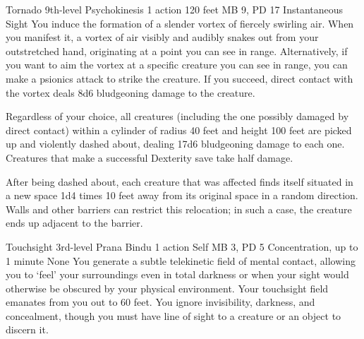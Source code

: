\DndPowerHeader%
    {Tornado\label{pwr:tornado}}
    {9th-level Psychokinesis}
    {1 action}
    {120 feet}
    {MB 9, PD 17}
    {Instantaneous}
    {Sight}
You induce the formation of a slender vortex
of fiercely swirling air. When you manifest it, a vortex of
air visibly and audibly snakes out from your outstretched
hand, originating at a point you can see in range.
Alternatively,
if you want to aim the vortex at a specific creature you can
see in range, you can make a psionics attack to strike the
creature. If you succeed, direct contact with the vortex deals
8d6 bludgeoning damage to the creature.

Regardless of your choice,
all creatures (including the one possibly damaged
by direct contact) within a cylinder of radius
40 feet and height 100 feet are picked up and violently dashed
about, dealing 17d6 bludgeoning damage to each one. Creatures
that make a successful Dexterity save take half damage.

After being dashed about, each creature that was affected
finds itself situated in a new space 1d4 times 10 feet away
from its original space in a random direction. Walls and other
barriers can restrict this relocation; in such a case, the
creature ends up adjacent to the barrier.

\DndPowerHeader%
    {Touchsight\label{pwr:touchsight}}
    {3rd-level Prana Bindu}
    {1 action}
    {Self}
    {MB 3, PD 5}
    {Concentration, up to 1 minute}
    {None}
You generate a subtle telekinetic field of
mental contact, allowing you to `feel' your surroundings
even in total darkness or when your sight would otherwise
be obscured by your physical environment. Your touchsight
field emanates from you out to 60 feet. You ignore invisibility,
darkness, and concealment, though you must have line of sight
to a creature or an object to discern it.

